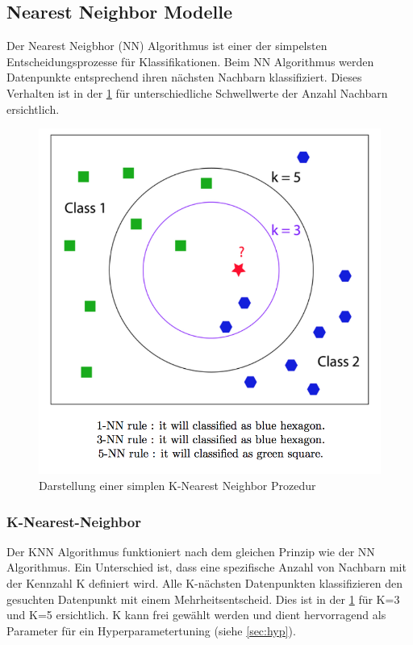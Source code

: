\subsection{Nearest Neighbor Modelle}
Der Nearest Neigbhor (NN) Algorithmus ist einer der simpelsten Entscheidungsprozesse für Klassifikationen.
Beim NN Algorithmus werden Datenpunkte entsprechend ihren nächsten Nachbarn klassifiziert. \cite{cover1967nearest}
Dieses Verhalten ist in der \cref{fig:knn} für unterschiedliche Schwellwerte der Anzahl Nachbarn ersichtlich.
\begin{figure}[H]
	\centering	
	\includegraphics[width=0.7\columnwidth,keepaspectratio]{img/knn.png}
	\caption{Darstellung einer simplen K-Nearest Neighbor Prozedur}
	\label{fig:knn}
\end{figure}
\subsubsection{K-Nearest-Neighbor}
Der KNN Algorithmus funktioniert nach dem gleichen Prinzip wie der NN Algorithmus.
Ein Unterschied ist, dass eine spezifische Anzahl von Nachbarn mit der Kennzahl K definiert wird.
Alle K-nächsten Datenpunkten klassifizieren den gesuchten Datenpunkt mit einem Mehrheitsentscheid.
Dies ist in der \cref{fig:knn} für K=3 und K=5 ersichtlich.
K kann frei gewählt werden und dient hervorragend als Parameter für ein Hyperparametertuning (siehe \cref{sec:hyp}). \cite{cover1967nearest}
